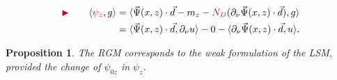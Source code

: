 \documentclass[10pt,xcolor={dvipsnames}]{beamer}
\newtheorem{proposition}[subsection]{Proposition}
\theoremstyle{plain}
\theoremstyle{plain}
\begin{document}
\begin{frame}
{\begin{align*}
&{\color{purple}\blacktriangleright }&\quad\langle {\color{purple}\psi_z} , g \rangle  & = \langle \vec{\Psi}(x,z)\cdot\vec{d} - m_z - {\color{purple}N_D}(\partial_\nu \vec{\Psi}(x,z) \cdot \vec{d}) , g \rangle\\ 
                             &&& = \langle \vec{\Psi}(x,z)\cdot\vec{d},\partial_\nu u\rangle - 0 - \langle\partial_\nu \vec{\Psi}(x,z) \cdot \vec{d},u\rangle.                                        
\end{align*}
}
\vspace{-0.8cm}
\begin{proposition}
 The RGM corresponds to the {\color{blue}weak formulation} of the LSM,
 provided the change of $\psi_{0z}$ in $\psi_z$.
\end{proposition}
\end{frame}
\end{document}
